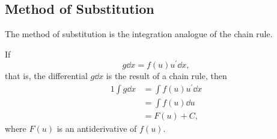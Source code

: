 \subsection{Method of Substitution}
The method of substitution is the integration analogue of the chain rule.

If
\[g\dd x=f(u)u^\prime\dd x,\]
that is, the differential $g\dd x$ is the result of a chain rule, then
\begin{alignat*}{1}
\int g\dd x & =\int f(u)u^\prime\dd x\\
            & =\int f(u)\dd u\\
			& =F(u)+C,
\end{alignat*}
where $F(u)$ is an antiderivative of $f(u)$.
